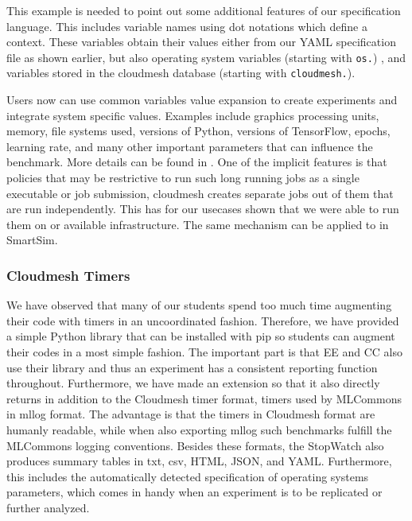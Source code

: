 \documentclass[sigconf]{acmart}
\begin{document}
This example is needed to point out some additional features of our specification language. This includes variable names using dot notations which define a context. These variables obtain their values either from our YAML specification file as shown earlier, but also operating system variables (starting with \lstinline|os.|) , and variables stored in the cloudmesh database (starting with \lstinline|cloudmesh.|). 

Users now can use common variables value expansion to create experiments and integrate system specific values. Examples include graphics processing units, memory, file systems used, versions of Python, versions of TensorFlow, epochs, learning rate, and many other important parameters that can influence the benchmark.  More details can be found in \citep{las-2022-templated}. One of the implicit features is that policies that may be restrictive to run such long running jobs as a single executable or job submission, cloudmesh creates separate jobs out of them that are run independently. This has for our usecases shown that we were able to run them on or available infrastructure. The same mechanism can be applied to in SmartSim.


\subsubsection{Cloudmesh Timers}
\label{sec:monitoring}

We have observed that many of our students spend too much time augmenting their code with timers in an uncoordinated fashion. Therefore, we have provided a simple Python library that can be installed with pip so students can augment their codes in a most simple fashion. The important part is that EE and CC also use their library and thus an experiment has a consistent reporting function throughout.  Furthermore, we have made an extension so that it also directly returns in addition to the Cloudmesh timer format, timers used by MLCommons in mllog format. The advantage is that the timers in Cloudmesh format are humanly readable, while when also exporting mllog such benchmarks fulfill the MLCommons logging conventions. Besides these formats, the StopWatch also produces summary tables in txt, csv, HTML, JSON, and YAML. Furthermore, this includes the automatically detected specification of operating systems parameters, which comes in handy when an experiment is to be replicated or further analyzed.

\end{document}
